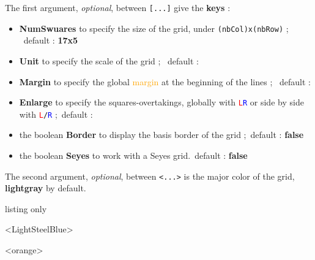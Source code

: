 \documentclass[a4paper]{article}
\newcommand\Cle[1]{{\bfseries\sffamily\textlangle #1\textrangle}}
\begin{document}
The first argument, \textit{optional}, between \texttt{[...]} give the \Cle{keys} :

\begin{itemize}
	\item \Cle{NumSwuares} to specify the size of the grid, under \texttt{(nbCol)x(nbRow)} ; \hfill~default : \Cle{17x5}
	\item \Cle{Unit} to specify the scale of the grid ; \hfill~default : \Cle{1}
	\item \Cle{Margin} to specify the global \textcolor{orange}{margin} at the beginning of the lines ; \hfill~default : \Cle{0}
	\item \Cle{Enlarge} to specify the squares-overtakings, globally with \texttt{\textcolor{red}{L}\textcolor{blue}{R}} or side by side with \texttt{\textcolor{red}{L}/\textcolor{blue}{R}} ;\hfill~default : \Cle{0}
	\item the boolean \Cle{Border} to display the basis border of the grid ;\hfill~default : \Cle{false}
	\item the boolean \Cle{Seyes} to work with a Seyes grid.\hfill~default : \Cle{false}
\end{itemize}

The second argument, \textit{optional}, between \texttt{<...>} is the major color of the grid, \Cle{lightgray} by default.

\medskip

\begin{PresentationCode}{listing only}

\begin{EnvGrid}[NumSquares=30x5]
\end{EnvGrid}

\begin{EnvGrid}[NumSquares=36x8,Enlarge=3/3]<LightSteelBlue>
\end{EnvGrid}

\begin{center}
	\begin{EnvGrid}[NumSquares=15x5,Enlarge=1/2,Seyes]<orange>
	\end{EnvGrid}
\end{center}
\end{PresentationCode}

\medskip

\begin{EnvGrid}[NumSquares=30x5,Border]
\end{EnvGrid}
\end{document}
